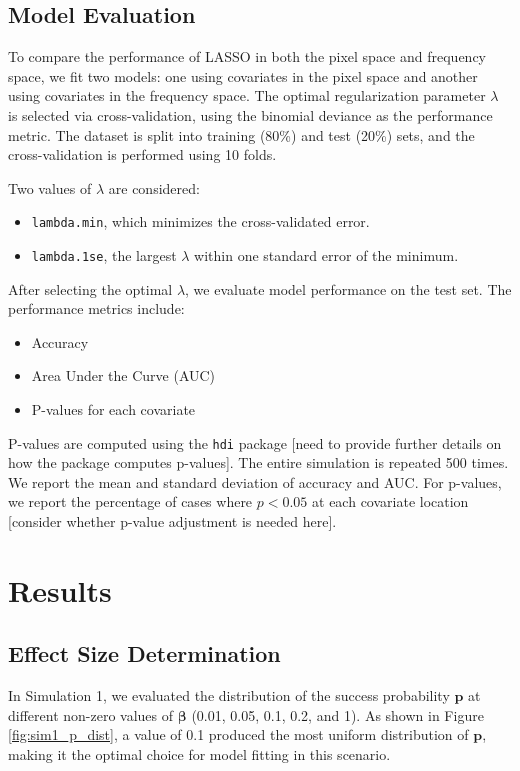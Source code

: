 \documentclass[12pt]{article}
\begin{document}
\subsection*{Model Evaluation}

To compare the performance of LASSO in both the pixel space and frequency space, we fit two models: one using covariates in the pixel space and another using covariates in the frequency space. The optimal regularization parameter \( \lambda \) is selected via cross-validation, using the binomial deviance as the performance metric. The dataset is split into training (80\%) and test (20\%) sets, and the cross-validation is performed using 10 folds.

Two values of \( \lambda \) are considered: 
\begin{itemize}
  \item \texttt{lambda.min}, which minimizes the cross-validated error.
  \item \texttt{lambda.1se}, the largest \( \lambda \) within one standard error of the minimum.
\end{itemize}

After selecting the optimal \( \lambda \), we evaluate model performance on the test set. The performance metrics include:
\begin{itemize}
  \item Accuracy
  \item Area Under the Curve (AUC)
  \item P-values for each covariate
\end{itemize}

P-values are computed using the \texttt{hdi} package [need to provide further details on how the package computes p-values]. The entire simulation is repeated 500 times. We report the mean and standard deviation of accuracy and AUC. For p-values, we report the percentage of cases where \( p < 0.05 \) at each covariate location [consider whether p-value adjustment is needed here].


\section*{Results}

\subsection*{Effect Size Determination}

In Simulation 1, we evaluated the distribution of the success probability \( \mathbf{p} \) at different non-zero values of \( \boldsymbol{\beta} \) (0.01, 0.05, 0.1, 0.2, and 1). As shown in Figure \ref{fig:sim1_p_dist}, a value of 0.1 produced the most uniform distribution of \( \mathbf{p} \), making it the optimal choice for model fitting in this scenario.
\end{document}
